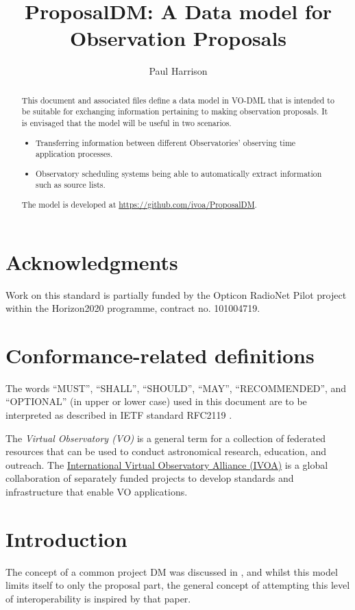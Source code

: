 \documentclass[10pt,a4paper]{ivoa}
\title{ProposalDM: A Data model for Observation Proposals}
\author[????URL????]{Paul Harrison}
\begin{document}
\begin{abstract}
This document and associated files define a data model in VO-DML that is intended to be suitable for exchanging
    information pertaining to making observation proposals. It is envisaged that the model will be useful in two scenarios.
\begin{itemize}
    \item Transferring information between different Observatories' observing time application processes.
    \item Observatory scheduling systems being able to automatically extract information such as source lists.
\end{itemize}

    The model is developed at \url{https://github.com/ivoa/ProposalDM}.
\end{abstract}


\section*{Acknowledgments}

Work on this standard is partially funded by the Opticon RadioNet Pilot project within the Horizon2020 programme, contract no. 101004719.

\section*{Conformance-related definitions}

The words ``MUST'', ``SHALL'', ``SHOULD'', ``MAY'', ``RECOMMENDED'', and
``OPTIONAL'' (in upper or lower case) used in this document are to be
interpreted as described in IETF standard RFC2119 \citep{std:RFC2119}.

The \emph{Virtual Observatory (VO)} is a
general term for a collection of federated resources that can be used
to conduct astronomical research, education, and outreach.
The \href{https://www.ivoa.net}{International
Virtual Observatory Alliance (IVOA)} is a global
collaboration of separately funded projects to develop standards and
infrastructure that enable VO applications.


\section{Introduction}


The concept of a common project DM was discussed in \cite{2008SPIE.7019E..0PB}, and whilst this model limits itself to
only the proposal part, the general concept of attempting this level of interoperability is inspired by that paper.
\end{document}
